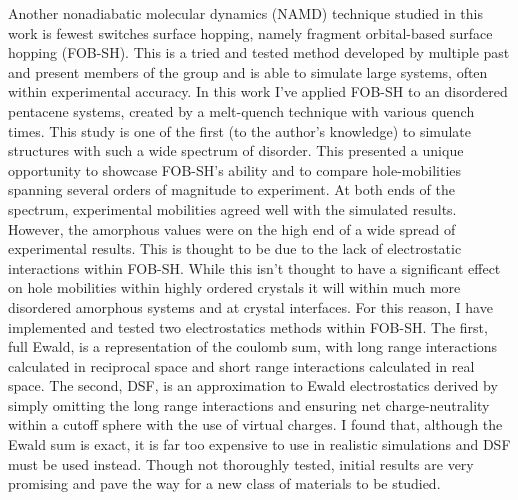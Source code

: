 Another nonadiabatic molecular dynamics (NAMD) technique studied in this work is fewest switches surface hopping, namely fragment orbital-based surface hopping (FOB-SH). This is a tried and tested method developed by multiple past and present members of the group and is able to simulate large systems, often within experimental accuracy. In this work I've applied FOB-SH to an disordered pentacene systems, created by a melt-quench technique with various quench times. This study is one of the first (to the author's knowledge) to simulate structures with such a wide spectrum of disorder. This presented a unique opportunity to showcase FOB-SH's ability and to compare hole-mobilities spanning several orders of magnitude to experiment. At both ends of the spectrum, experimental mobilities agreed well with the simulated results. However, the amorphous values were on the high end of a wide spread of experimental results. This is thought to be due to the lack of electrostatic interactions within FOB-SH. While this isn't thought to have a significant effect on hole mobilities within highly ordered crystals it will within much more disordered amorphous systems and at crystal interfaces. For this reason, I have implemented and tested two electrostatics methods within FOB-SH. The first, full Ewald, is a representation of the coulomb sum, with long range interactions calculated in reciprocal space and short range interactions calculated in real space. The second, DSF, is an approximation to Ewald electrostatics derived by simply omitting the long range interactions and ensuring net charge-neutrality within a cutoff sphere with the use of virtual charges. I found that, although the Ewald sum is exact, it is far too expensive to use in realistic simulations and DSF must be used instead. Though not thoroughly tested, initial results are very promising and pave the way for a new class of materials to be studied.
